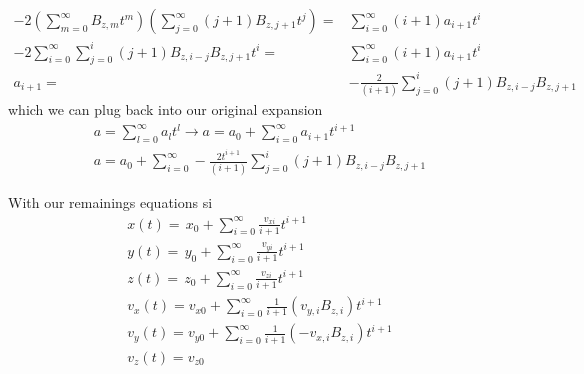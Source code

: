 \documentclass[9pt]{article}
\begin{document}
\begin{multicols}{2}
    \begin{equation}
        \begin{split}            
            -2\left(\sum_{m=0}^\infty B_{z,m}t^m\right)\left(\sum_{j=0}^\infty (j+1)B_{z,j+1}t^{j}\right)=&\sum_{i=0}^\infty (i+1)a_{i+1}t^{i}\\
            -2\sum_{i=0}^\infty\sum_{j=0}^i(j+1)B_{z,i-j}B_{z,j+1}t^{i}=&\sum_{i=0}^\infty (i+1)a_{i+1}t^{i}\\
            a_{i+1}=&-\frac{2}{(i+1)}\sum_{j=0}^i(j+1)B_{z,i-j}B_{z,j+1}
        \end{split}
    \end{equation}
which we can plug back into our original expansion
    \begin{equation}
        \begin{split}
            a=\sum_{l=0}^\infty a_lt^l\longrightarrow a=a_0+\sum_{i=0}^\infty a_{i+1}t^{i+1}\\
            \boxed{a=a_0+\sum_{i=0}^\infty -\frac{2t^{i+1}}{(i+1)}\sum_{j=0}^i(j+1)B_{z,i-j}B_{z,j+1}}
        \end{split}
    \end{equation}



With our remainings equations si
\begin{align}
        x(t)=\,x_0 + \sum_{i=0}^\infty\frac{v_{xi}}{i+1} t^{i+1}\\
        y(t)=\,y_0 + \sum_{i=0}^\infty\frac{v_{yi}}{i+1} t^{i+1}\\
        z(t)=\,z_0 + \sum_{i=0}^\infty\frac{v_{zi}}{i+1} t^{i+1}\\
        v_x(t)=v_{x0}+\sum_{i=0}^\infty\frac{1}{i+1} (v_{y,i}B_{z,i})t^{i+1}\\
        v_y(t)=v_{y0}+\sum_{i=0}^\infty\frac{1}{i+1} (-v_{x,i}B_{z,i})t^{i+1}\\
        v_z(t)=v_{z0}
    \end{align}


\end{multicols}
\end{document}

